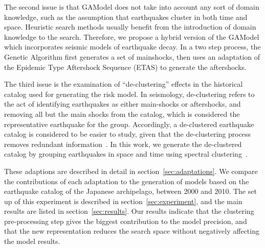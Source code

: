 The second issue is that GAModel does not take into account any sort
of domain knowledge, such as the assumption that earthquakes cluster
in both time and space. Heuristic search methods usually benefit from
the introduction of domain knowledge to the search. Therefore, we
propose a hybrid version of the GAModel which incorporates seismic
models of earthquake decay. In a two step process, the Genetic
Algorithm first generates a set of mainshocks, then uses an adaptation
of the Epidemic Type Aftershock Sequence (ETAS) to generate the
aftershocks.

The third issue is the examination of ``de-clustering'' effects in the
historical catalog used for generating the risk model. In seismology,
de-clustering refers to the act of identifying earthquakes as either
main-shocks or aftershocks, and removing all but the main shocks from
the catalog, which is considered the representative earthquake for the
group. Accordingly, a de-clustered earthquake catalog is considered to
be easier to study, given that the de-clustering process removes
redundant information~\cite{van2012seismicity}. In this work, we
generate the de-clustered catalog by grouping earthquakes in space and
time using spectral clustering~\cite{spectral_tutorial}.

These adaptions are described in detail in
section~\ref{sec:adaptations}. We compare the contributions of each
adaptation to the generation of models based on the earthquake catalog
of the Japanese archipelago, between 2000 and 2010. The set up of this
experiment is described in section~\ref{sec:experiment}, and the main
results are listed in section~\ref{sec:results}.  Our results indicate
that the clustering pre-processing step gives the biggest contribution
to the model precision, and that the new representation reduces the
search space without negatively affecting the model results.

